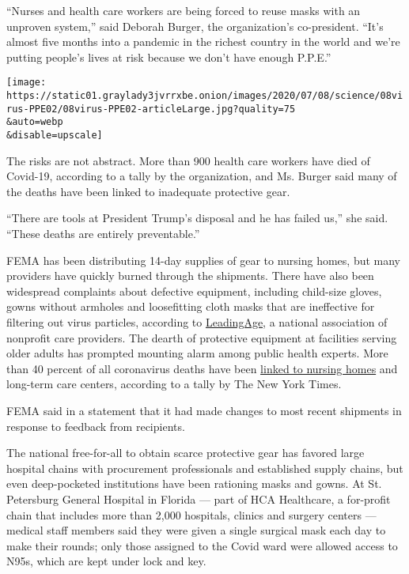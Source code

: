 ``Nurses and health care workers are being forced to reuse masks with an
unproven system,'' said Deborah Burger, the organization's co-president.
``It's almost five months into a pandemic in the richest country in the
world and we're putting people's lives at risk because we don't have
enough P.P.E.''

\texttt{[image: https://static01.graylady3jvrrxbe.onion/images/2020/07/08/science/08virus-PPE02/08virus-PPE02-articleLarge.jpg?quality=75\\\&auto=webp\\\&disable=upscale]}

The risks are not abstract. More than 900 health care workers have died
of Covid-19, according to a tally by the organization, and Ms. Burger
said many of the deaths have been linked to inadequate protective gear.

``There are tools at President Trump's disposal and he has failed us,''
she said. ``These deaths are entirely preventable.''

FEMA has been distributing 14-day supplies of gear to nursing homes, but
many providers have quickly burned through the shipments. There have
also been widespread complaints about defective equipment, including
child-size gloves, gowns without armholes and loosefitting cloth masks
that are ineffective for filtering out virus particles, according to
\href{https://www.leadingage.org/}{LeadingAge}, a national association
of nonprofit care providers. The dearth of protective equipment at
facilities serving older adults has prompted mounting alarm among public
health experts. More than 40 percent of all coronavirus deaths have been
\href{https://www.nytimes3xbfgragh.onion/interactive/2020/us/coronavirus-nursing-homes.html}{linked
to nursing homes} and long-term care centers, according to a tally by
The New York Times.

FEMA said in a statement that it had made changes to most recent
shipments in response to feedback from recipients.

The national free-for-all to obtain scarce protective gear has favored
large hospital chains with procurement professionals and established
supply chains, but even deep-pocketed institutions have been rationing
masks and gowns. At St. Petersburg General Hospital in Florida --- part
of HCA Healthcare, a for-profit chain that includes more than 2,000
hospitals, clinics and surgery centers --- medical staff members said
they were given a single surgical mask each day to make their rounds;
only those assigned to the Covid ward were allowed access to N95s, which
are kept under lock and key.

